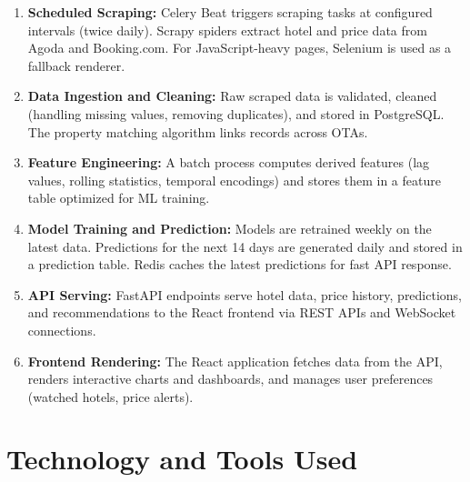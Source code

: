 \documentclass[12pt,a4paper]{report}
\begin{document}
\begin{enumerate}
    \item \textbf{Scheduled Scraping:} Celery Beat triggers scraping tasks at configured intervals (twice daily). Scrapy spiders extract hotel and price data from Agoda and Booking.com. For JavaScript-heavy pages, Selenium is used as a fallback renderer.
    
    \item \textbf{Data Ingestion and Cleaning:} Raw scraped data is validated, cleaned (handling missing values, removing duplicates), and stored in PostgreSQL. The property matching algorithm links records across OTAs.
    
    \item \textbf{Feature Engineering:} A batch process computes derived features (lag values, rolling statistics, temporal encodings) and stores them in a feature table optimized for ML training.
    
    \item \textbf{Model Training and Prediction:} Models are retrained weekly on the latest data. Predictions for the next 14 days are generated daily and stored in a prediction table. Redis caches the latest predictions for fast API response.
    
    \item \textbf{API Serving:} FastAPI endpoints serve hotel data, price history, predictions, and recommendations to the React frontend via REST APIs and WebSocket connections.
    
    \item \textbf{Frontend Rendering:} The React application fetches data from the API, renders interactive charts and dashboards, and manages user preferences (watched hotels, price alerts).
\end{enumerate}

\section{Technology and Tools Used}
\end{document}
